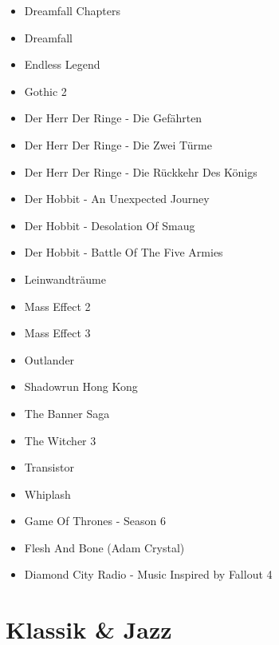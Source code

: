 \begin{itemize}
	\item Dreamfall Chapters 
	\item Dreamfall
	\item Endless Legend
	\item Gothic 2
	\item Der Herr Der Ringe - Die Gefährten
	\item Der Herr Der Ringe - Die Zwei Türme
	\item Der Herr Der Ringe - Die Rückkehr Des Königs
	\item Der Hobbit - An Unexpected Journey
	\item Der Hobbit - Desolation Of Smaug
	\item Der Hobbit - Battle Of The Five Armies
	\item Leinwandträume
	\item Mass Effect 2
	\item Mass Effect 3
	\item Outlander
	\item Shadowrun Hong Kong
	\item The Banner Saga
	\item The Witcher 3 
	\item Transistor
	\item Whiplash
	\item Game Of Thrones - Season 6
	\item Flesh And Bone (Adam Crystal)
	\item Diamond City Radio - Music Inspired by Fallout 4
\end{itemize}

\cleardoublepage
\section{Klassik \& Jazz}

